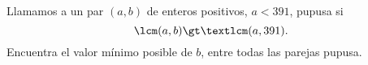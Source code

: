 Llamamos a un par $(a,b)$ de enteros positivos, $a\lt391$, pupusa si
\[\lcm(a,b)\gt\textlcm(a,391).\]
Encuentra el valor mínimo posible de $b$, entre todas las parejas pupusa.
